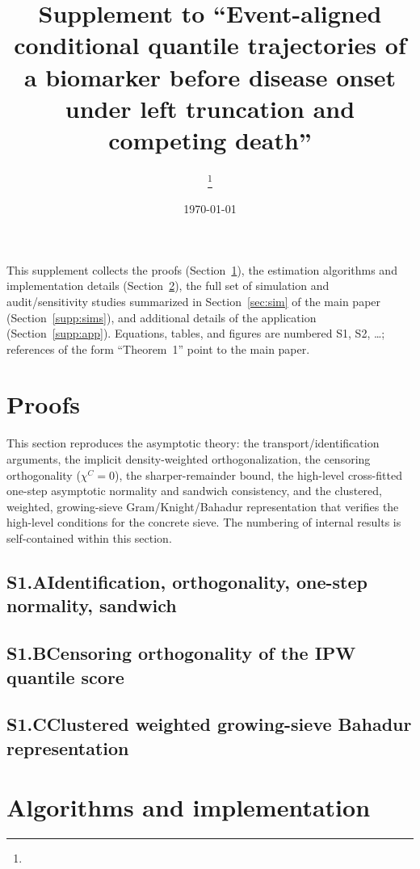 \documentclass[11pt]{article}
\title{\bf Supplement to ``Event-aligned conditional quantile trajectories of a
biomarker before disease onset under left truncation and competing death''}
\author{\thanks{}}
\date{\today}
\theoremstyle{remark}\newtheorem{remark}{Remark}
\begin{document}
\maketitle
\tableofcontents
\bigskip

This supplement collects the proofs (Section~\ref{supp:proofs}), the estimation
algorithms and implementation details (Section~\ref{supp:algo}), the full set of
simulation and audit/sensitivity studies summarized in Section~\ref{sec:sim} of the
main paper (Section~\ref{supp:sims}), and additional details of the application
(Section~\ref{supp:app}). Equations, tables, and figures are numbered S1, S2, \dots;
references of the form ``Theorem~1'' point to the main paper.

\section{Proofs}\label{supp:proofs}
This section reproduces the asymptotic theory: the transport/identification
arguments, the implicit density-weighted orthogonalization, the censoring
orthogonality ($\chi^C=0$), the sharper-remainder bound, the high-level
cross-fitted one-step asymptotic normality and sandwich consistency, and the
clustered, weighted, growing-sieve Gram/Knight/Bahadur representation that verifies
the high-level conditions for the concrete sieve. The numbering of internal
results is self-contained within this section.

\subsection*{S1.A\quad Identification, orthogonality, one-step normality, sandwich}


\subsection*{S1.B\quad Censoring orthogonality of the IPW quantile score}


\subsection*{S1.C\quad Clustered weighted growing-sieve Bahadur representation}


\section{Algorithms and implementation}\label{supp:algo}
\end{document}
